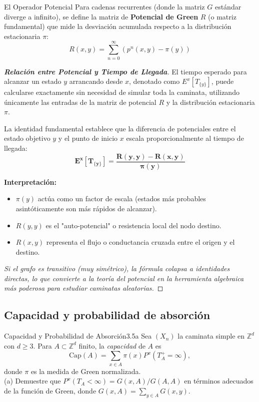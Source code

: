 \documentclass[10pt,a4paper]{article}
\begin{document}
\vspace{2mm}

\begin{nota}{El Operador Potencial}
    Para cadenas recurrentes (donde la matriz $G$ estándar diverge a infinito), se define la matriz de \textbf{Potencial de Green} $R$ (o matriz fundamental) que mide la desviación acumulada respecto a la distribución estacionaria $\pi$:
    \[ R(x,y) = \sum_{n=0}^\infty (p^n(x,y) - \pi(y)) \]
\end{nota}

\begin{proof}[\textbf{Relación entre Potencial y Tiempo de Llegada}]
    El tiempo esperado para alcanzar un estado $y$ arrancando desde $x$, denotado como $E^x[T_{\{y\}}]$, puede calcularse exactamente sin necesidad de simular toda la caminata, utilizando únicamente las entradas de la matriz de potencial $R$ y la distribución estacionaria $\pi$.
    
    La identidad fundamental establece que la diferencia de potenciales entre el estado objetivo $y$ y el punto de inicio $x$ escala proporcionalmente al tiempo de llegada:
    \[ \mathbf{E^x[T_{\{y\}}] = \frac{R(y,y) - R(x,y)}{\pi(y)}} \]
    
    \textbf{Interpretación:}
    \begin{itemize}
        \item $\pi(y)$ actúa como un factor de escala (estados más probables asintóticamente son más rápidos de alcanzar).
        \item $R(y,y)$ es el "auto-potencial" o resistencia local del nodo destino.
        \item $R(x,y)$ representa el flujo o conductancia cruzada entre el origen y el destino.
    \end{itemize}
    \textit{Si el grafo es transitivo (muy simétrico), la fórmula colapsa a identidades directas, lo que convierte a la teoría del potencial en la herramienta algebraica más poderosa para estudiar caminatas aleatorias.}
\end{proof}

\newpage
\subsection{Capacidad y probabilidad de absorción}

\begin{ejercicio}{Capacidad y Probabilidad de Absorción}{3.5a}
    Sea $(X_n)$ la caminata simple en $\mathbb{Z}^d$ con $d \ge 3$. Para $A \subset \mathbb{Z}^d$ finito, la \textit{capacidad} de $A$ es
    \[ \text{Cap}(A) = \sum_{x \in A} \pi(x) P^x(T_A^+ = \infty), \]
    donde $\pi$ es la medida de Green normalizada. \\
    (a) Demuestre que $P^x(T_A < \infty) = G(x, A) / G(A, A)$ en términos adecuados de la función de Green, donde $G(x, A) = \sum_{y \in A} G(x, y)$.
\end{ejercicio}
\end{document}

